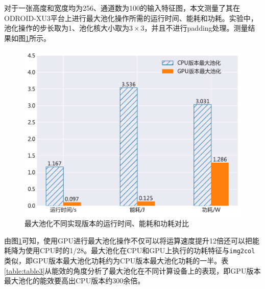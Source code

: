
对于一张高度和宽度均为256、通道数为100的输入特征图，本文测量了其在ODROID-XU3平台上进行最大池化操作所需的运行时间、能耗和功耗。实验中，池化操作的步长取为1、池化核大小取为$3 \times 3$，并且不进行padding处理。测量结果如图\ref{figure:figure12}所示。

\begin{figure}[htb]
    \begin{center}
    \includegraphics[height=0.4\textwidth]{figures/pool_energy.pdf}
    \end{center}
    \caption{最大池化不同实现版本的运行时间、能耗和功耗对比}\label{figure:figure12}
\end{figure}

由图\ref{figure:figure12}可知，使用GPU进行最大池化操作不仅可以将运算速度提升12倍还可以把能耗降为使用CPU时的1/28。最大池化在CPU和GPU上执行的功耗特征与\texttt{img2col}类似，即GPU版本最大池化功耗约为CPU版本最大池化功耗的一半。表\ref{table:table3}从能效的角度分析了最大池化在不同计算设备上的表现，即GPU版本最大池化的能效要高出CPU版本约300余倍。

